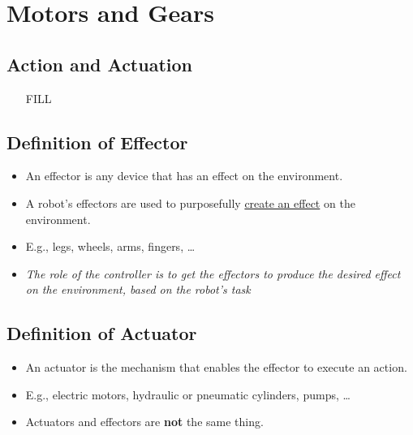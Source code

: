 \documentclass[10pt]{article}
\begin{document}
\section*{Motors and Gears}
\subsection*{Action and Actuation}
\begin{itemize}
	\item [FILL]
\end{itemize}
\subsection*{Definition of Effector}
\begin{itemize}
	\item An effector is any device that has an effect on the environment.
	\item A robot's effectors are used to purposefully \underline{create an effect} on the environment.
	\item E.g., legs, wheels, arms, fingers, \dots
	\item \textit{The role of the controller is to get the effectors to produce the desired effect on the environment, based on the robot's task}
\end{itemize}

\subsection*{Definition of Actuator}
\begin{itemize}
	\item An actuator is the mechanism that enables the effector to execute an action.
	\item E.g., electric motors, hydraulic or pneumatic cylinders, pumps, \dots
	\item Actuators and effectors are \textbf{not} the same thing.
\end{itemize}
\end{document}
